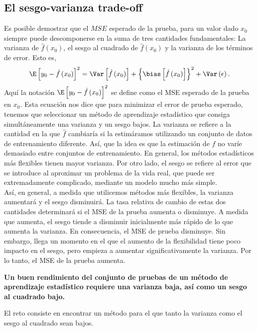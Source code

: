 \subsection{El sesgo-varianza trade-off}
Es posible demostrar que el $MSE$ esperado de la prueba, para un valor dado $x_0$ siempre puede descomponerse en la suma de tres cantidades fundamentales: La varianza de $\hat{f}\left(x_0\right)$, el sesgo al cuadrado de $\hat{f}\left(x_0\right)$ y la varianza de los términos de error. Esto es,
$$\E\left[y_0-\hat{f}\left(x_0\right)\right]^2 = \Var\left[\hat{f}\left(x_0\right)\right] + \left\{\bias\left[\hat{f}\left(x_0\right)\right]\right\}^2 + \Var\left(\epsilon\right).$$
Aquí la notación $\E\left[y_0-\hat{f}\left(x_0\right)\right]^2$ se define como el MSE esperado de la prueba en $x_0$. Esta ecuación nos dice que para minimizar el error de prueba esperado, tenemos que seleccionar un método de aprendizaje estadístico que consiga simultáneamente una varianza y un sesgo bajos. La varianza se refiere a la cantidad en la que $\hat{f}$ cambiaría si la estimáramos utilizando un conjunto de datos de entrenamiento diferente. Así, que la idea es que la estimación de $f$ no varíe demasiado entre conjuntos de entrenamiento. En general, los métodos estadísticos más flexibles tienen mayor varianza. Por otro lado, el sesgo se refiere al error que se introduce al aproximar un problema de la vida real, que puede ser extremadamente complicado, mediante un modelo mucho más simple. \\
Así, en general, a medida que utilicemos métodos más flexibles, la varianza aumentará y el sesgo disminuirá. La tasa relativa de cambio de estas dos cantidades determinará si el MSE de la prueba aumenta o disminuye. A medida que aumenta, el sesgo tiende a disminuir inicialmente más rápido de lo que aumenta la varianza. En consecuencia, el MSE de prueba disminuye. Sin embargo, llega un momento en el que el aumento de la flexibilidad tiene poco impacto en el sesgo, pero empieza a aumentar significativamente la varianza. Por lo tanto, el MSE de la prueba aumenta. \\

\begin{center}
    \textbf{\textbf{Un buen rendimiento del conjunto de pruebas de un método de aprendizaje estadístico requiere una varianza baja, así como un sesgo al cuadrado bajo. }}\\
\end{center}

 El reto consiste en encontrar un método para el que tanto la varianza como el sesgo al cuadrado sean bajos.


